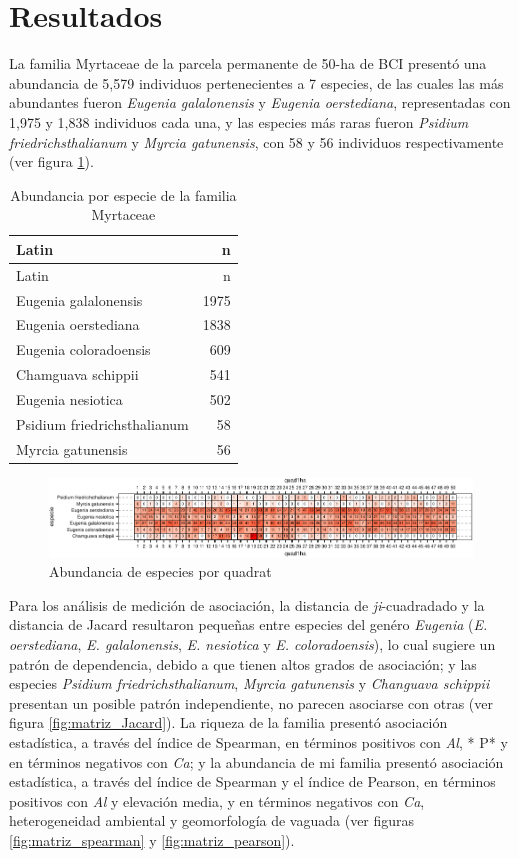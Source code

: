 \documentclass[11pt,]{article}
\begin{document}
\section{Resultados}\label{resultados}

La familia Myrtaceae de la parcela permanente de 50-ha de BCI presentó
una abundancia de 5,579 individuos pertenecientes a 7 especies, de las
cuales las más abundantes fueron \emph{Eugenia galalonensis} y
\emph{Eugenia oerstediana}, representadas con 1,975 y 1,838 individuos
cada una, y las especies más raras fueron \emph{Psidium
friedrichsthalianum} y \emph{Myrcia gatunensis}, con 58 y 56 individuos
respectivamente (ver figura \ref{tab:abun_sp}).

\begin{longtable}[]{@{}lr@{}}
\caption{\label{tab:abun_sp}Abundancia por especie de la familia
Myrtaceae}\tabularnewline
\toprule
Latin & n\tabularnewline
\midrule
\endfirsthead
\toprule
Latin & n\tabularnewline
\midrule
\endhead
Eugenia galalonensis & 1975\tabularnewline
Eugenia oerstediana & 1838\tabularnewline
Eugenia coloradoensis & 609\tabularnewline
Chamguava schippii & 541\tabularnewline
Eugenia nesiotica & 502\tabularnewline
Psidium friedrichsthalianum & 58\tabularnewline
Myrcia gatunensis & 56\tabularnewline
\bottomrule
\end{longtable}

\begin{figure}
\centering
\includegraphics{manuscrito_files/figure-latex/unnamed-chunk-3-1.pdf}
\caption{\label{fig:abun_sp_q}Abundancia de especies por quadrat}
\end{figure}

Para los análisis de medición de asociación, la distancia de
\emph{ji}-cuadradado y la distancia de Jacard resultaron pequeñas entre
especies del genéro \emph{Eugenia} (\emph{E. oerstediana}, \emph{E.
galalonensis}, \emph{E. nesiotica} y \emph{E. coloradoensis}), lo cual
sugiere un patrón de dependencia, debido a que tienen altos grados de
asociación; y las especies \emph{Psidium friedrichsthalianum},
\emph{Myrcia gatunensis} y \emph{Changuava schippii} presentan un
posible patrón independiente, no parecen asociarse con otras (ver figura
\ref{fig:matriz_Jacard}). La riqueza de la familia presentó asociación
estadística, a través del índice de Spearman, en términos positivos con
\emph{Al}, * P* y en términos negativos con \emph{Ca}; y la abundancia
de mi familia presentó asociación estadística, a través del índice de
Spearman y el índice de Pearson, en términos positivos con \emph{Al} y
elevación media, y en términos negativos con \emph{Ca}, heterogeneidad
ambiental y geomorfología de vaguada (ver figuras
\ref{fig:matriz_spearman} y \ref{fig:matriz_pearson}).
\end{document}
